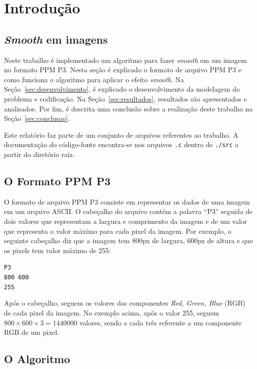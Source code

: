 \section{Introdução \label{sec:introducao}}

\subsection{\textit{Smooth} em imagens}

Neste trabalho é implementado um algoritmo para fazer \textit{smooth} em um imagem no formato PPM P3. Nesta seção é explicado o formato de arquivo PPM P3 e como funciona o algoritmo para aplicar o efeito \textit{smooth}. Na Seção~\ref{sec:desenvolvimento}, é explicado o desenvolvimento da modelagem do problema e codificação. Na Seção~\ref{sec:resultados}, resultados são apresentados e analisados. Por fim, é descrita uma conclusão sobre a realização deste trabalho na Seção~\ref{sec:conclusao}.

Este relatório faz parte de um conjunto de arquivos referentes ao trabalho. A documentação do código-fonte encontra-se nos arquivos \texttt{.c} dentro de \texttt{./src} a partir do diretório raiz.

\subsection{O Formato PPM P3}

O formato de arquivo PPM P3 consiste em representar os dados de uma imagem em um arquivo ASCII. O cabeçalho do arquivo contém a palavra ``P3'' seguida de dois valores que representam a largura e comprimento da imagem e de um valor que representa o valor máximo para cada pixel da imagem. Por exemplo, o seguinte cabeçalho diz que a imagem tem 800px de largura, 600px de altura e que os pixels tem valor máximo de 255:

\texttt{P3} \\
\indent\texttt{800 600} \\
\indent\texttt{255}

Após o cabeçalho, seguem os valores das componentes \textit{Red, Green, Blue} (RGB) de cada pixel da imagem. No exemplo acima, após o valor 255, seguem $800 \times 600 \times 3 = 1 440 000$ valores, sendo a cada três referente a um componente RGB de um pixel.

\subsection{O Algoritmo \label{sec:algoritmo}}

